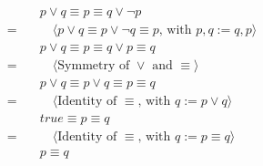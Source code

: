 \documentclass{article}
\begin{document}
\begin{align*}
        & \quad p \vee q \equiv p \equiv q \vee \neg p \\
        = & \quad\quad \langle p \vee q \equiv p \vee \neg q \equiv p \text{, with } p,q := q,p \rangle \\
        & \quad p \vee q \equiv p \equiv q \vee p \equiv q \\
        = & \quad\quad \langle \text{Symmetry of } \vee \text{ and } \equiv \rangle \\
        & \quad p \vee q \equiv p \vee q \equiv p \equiv q \\
        = & \quad\quad \langle \text{Identity of } \equiv \text{, with } q := p \vee q \rangle \\
        & \quad true \equiv p \equiv q \\
        = & \quad\quad \langle \text{Identity of } \equiv \text{, with } q := p \equiv q \rangle \\
        & \quad p \equiv q \\
    \end{align*}
\end{document}
